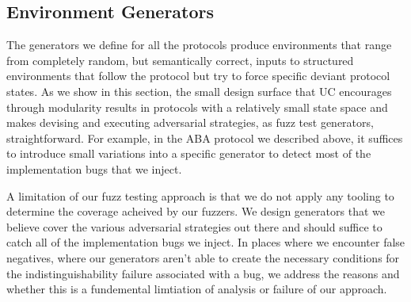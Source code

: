 \subsection{Environment Generators}
The generators we define for all the protocols produce environments that range from completely random, but semantically correct, inputs to structured environments that follow the protocol but try to force specific deviant protocol states.
As we show in this section, the small design surface that UC encourages through modularity results in protocols with a relatively small state space and makes devising and executing adversarial strategies, as fuzz test generators, straightforward.
For example, in the ABA protocol we described above, it suffices to introduce small variations into a specific generator to detect most of the implementation bugs that we inject.

A limitation of our fuzz testing approach is that we do not apply any tooling to determine the coverage acheived by our fuzzers.
We design generators that we believe cover the various adversarial strategies out there and should suffice to catch all of the implementation bugs we inject.
In places where we encounter false negatives, where our generators aren't able to create the necessary conditions for the indistinguishability failure associated with a bug, we address the reasons and whether this is a fundemental limtiation of analysis or failure of our approach.


